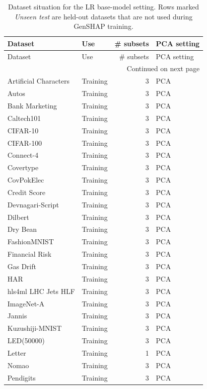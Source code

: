 \begin{scriptsize}
\setlength{\tabcolsep}{5pt}
\begin{longtable}{p{4.1cm}p{2.2cm}r p{3.5cm}}
\caption{Dataset situation for the LR base-model setting. Rows marked \emph{Unseen test} are held-out datasets that are not used during GenSHAP training.}\label{tab:dataset-situation-lr}\\
\toprule
Dataset & Use & \# subsets & PCA setting \\
\midrule
\endfirsthead
\toprule
Dataset & Use & \# subsets & PCA setting \\
\midrule
\endhead
\midrule
\multicolumn{4}{r}{Continued on next page} \\
\endfoot
\bottomrule
\endlastfoot
Artificial Characters & Training & 3 & PCA \\
Autos & Training & 3 & PCA \\
Bank Marketing & Training & 3 & PCA \\
Caltech101 & Training & 3 & PCA \\
CIFAR-10 & Training & 3 & PCA \\
CIFAR-100 & Training & 3 & PCA \\
Connect-4 & Training & 3 & PCA \\
Covertype & Training & 3 & PCA \\
CovPokElec & Training & 3 & PCA \\
Credit Score & Training & 3 & PCA \\
Devnagari-Script & Training & 3 & PCA \\
Dilbert & Training & 3 & PCA \\
Dry Bean & Training & 3 & PCA \\
FashionMNIST & Training & 3 & PCA \\
Financial Risk & Training & 3 & PCA \\
Gas Drift & Training & 3 & PCA \\
HAR & Training & 3 & PCA \\
hls4ml LHC Jets HLF & Training & 3 & PCA \\
ImageNet-A & Training & 3 & PCA \\
Jannis & Training & 3 & PCA \\
Kuzushiji-MNIST & Training & 3 & PCA \\
LED(50000) & Training & 3 & PCA \\
Letter & Training & 1 & PCA \\
Nomao & Training & 3 & PCA \\
Pendigits & Training & 3 & PCA \\

\end{longtable}
\end{scriptsize}
